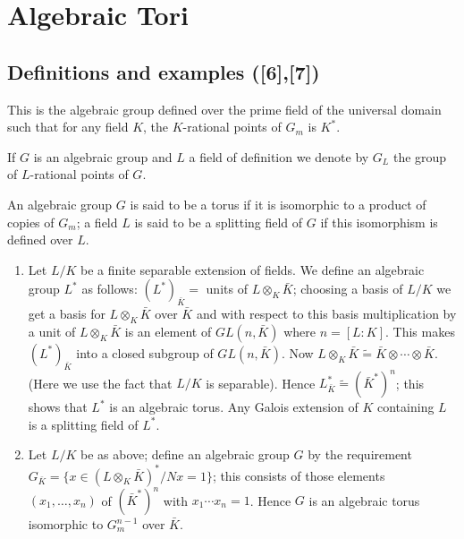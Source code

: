 

\chapter{Algebraic Tori}\label{chap3}

\section{Definitions and examples ([6],[7])}\label{chap3:sec3.1} 
\pageoriginale

\medskip
{}
This is the algebraic group defined  over the prime field
 of the universal domain such that for any field $K$, the $K$-rational
 points of $G_m$ is $K^*$. 

\medskip
{}
 If $G$ is an algebraic group and $L$ a field of definition we denote
 by $G_L$ the group of $L$-rational points of $G$. 

\begin{defi*}
An algebraic group $G$ is said to be a torus if it is isomorphic to a
product of copies of $G_m$; a field $L$ is said to be a splitting
field of $G$ if this isomorphism is defined over $L$. 
\end{defi*}

\begin{example*}
\begin{enumerate}[1)]
\item Let $L/K$ be a finite separable extension of fields. We define
  an algebraic group $L^*$ as follows: $(L^*)_{\bar{K}}= $ units of  
$ L \otimes_K \bar{K}$; choosing a basis of $L/K$ we get a basis for
$L \otimes_K \bar{K}$
  over $\bar{K}$ and with respect to this basis multiplication by a
  unit of $L \otimes_K \bar{K}$ is an element of $GL(n,\bar{K})$ where
  $n=[L:K]$. This makes $(L^*)_{\bar{K}}$ into a closed subgroup of
  $GL(n, \bar{K})$. Now $L \otimes_K  \bar{K} \widetilde{=}  \bar{K} \otimes
  \cdots \otimes \bar{K}$. (Here we use the fact that $L/K$ is
  separable). Hence $L^*_{\bar{K}} \widetilde{=}  (\bar{K}^*)^n$; this
  shows that $L^*$ is an algebraic torus. Any Galois extension of
  $K$ containing $L$ is a splitting field of $L^*$. 

\item Let $L/K$ be as above; define an algebraic group $G$ by the
  requirement $G_{\bar{K}}= \{ x \in (L \otimes_K \bar{K})^* /
  Nx=1\}$; this consists of those elements $(x_1, \ldots, x_n)$
  of $(\bar{K}^*)^n$ with $x_1 \cdots x_n =1$. Hence $G$ is an
  algebraic torus isomorphic to $G_m^{n-1}$ over $\bar{K}$. 
\end{enumerate}
\end{example*}


